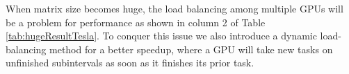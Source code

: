 
When matrix size becomes huge, the load balancing among multiple GPUs will be a problem for performance as shown in column 2 of Table \ref{tab:hugeResultTesla}.
To conquer this issue we also introduce a dynamic load-balancing method for a better speedup, where a GPU will take new tasks on unfinished subintervals as soon as it finishes its prior task.




